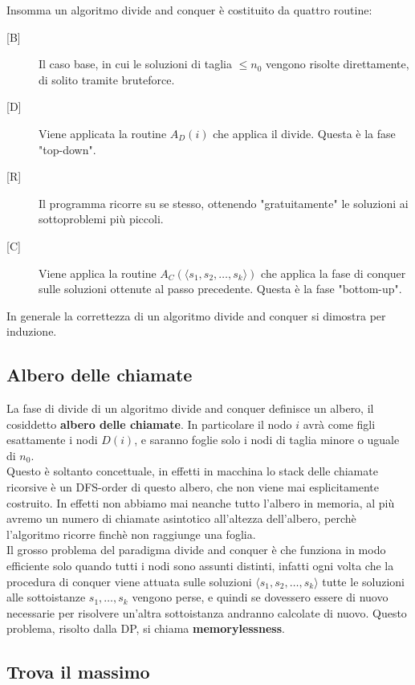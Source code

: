 \documentclass[11pt]{scrartcl}
\begin{document}
	Insomma un algoritmo divide and conquer è costituito da quattro routine:
	\begin{description}
		\item[{[B]}] Il caso base, in cui le soluzioni di taglia $\le n_0$ vengono risolte direttamente, di solito tramite bruteforce.
		\item[{[D]}] Viene applicata la routine $A_D(i)$ che applica il divide. Questa è la fase "top-down".
		\item[{[R]}] Il programma ricorre su se stesso, ottenendo "gratuitamente" le soluzioni ai sottoproblemi più piccoli.
		\item[{[C]}] Viene applica la routine $A_C(\langle s_1,s_2,\dots,s_k\rangle)$ che applica la fase di conquer sulle soluzioni ottenute al passo precedente. Questa è la fase "bottom-up".
	\end{description}
	In generale la correttezza di un algoritmo divide and conquer si dimostra per induzione.
	\subsection{Albero delle chiamate}
	
	La fase di divide di un algoritmo divide and conquer definisce un albero, il cosiddetto \textbf{albero delle chiamate}. In particolare il nodo $i$ avrà come figli esattamente i nodi $D(i)$, e saranno foglie solo i nodi di taglia minore o uguale di $n_0$. \\
	Questo è soltanto concettuale, in effetti in macchina lo stack delle chiamate ricorsive è un DFS-order di questo albero, che non viene mai esplicitamente costruito. In effetti non abbiamo mai neanche tutto l'albero in memoria, al più avremo un numero di chiamate asintotico all'altezza dell'albero, perchè l'algoritmo ricorre finchè non raggiunge una foglia. \\
	Il grosso problema del paradigma divide and conquer è che funziona in modo efficiente solo quando tutti i nodi sono assunti distinti, infatti ogni volta che la procedura di conquer viene attuata sulle soluzioni $\langle s_1,s_2,\dots, s_k\rangle$ tutte le soluzioni alle sottoistanze $s_1,\dots,s_k$ vengono perse, e quindi se dovessero essere di nuovo necessarie per risolvere un'altra sottoistanza andranno calcolate di nuovo. Questo problema, risolto dalla DP, si chiama \textbf{memorylessness}.
	
	\subsection{Trova il massimo}
	
\end{document}
